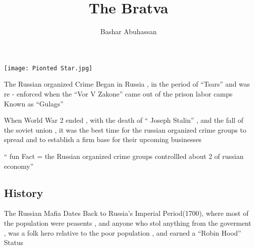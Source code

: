 \documentclass{article}
\author{Bashar Abuhassan}
\title{The Bratva}
\begin{document}
\maketitle
\texttt{[image: Pionted Star.jpg]}

The Russian organized Crime Began in Russia , in the period of ``Tsars'' and was re - enforced when the ``Vor V Zakone'' came out of the prison labor camps Known as ``Gulags'' 

When World War 2 ended , with the death of `` Joseph Stalin'' , and the fall of the soviet union , it was the best time for the russian organized crime groups to spread and to establish a firm base for their upcoming businesses 

`` fun Fact = the Russian organized crime groups controllled about 2\3 of russian economy''

\begin{center}
\section{History}
\end{center}

The Russian Mafia Dates Back to Russia's Imperial Period(1700), where most of the population were peasents , and anyone who stol anything from the goverment , was a folk hero relative to the poor population , and earned a ``Robin Hood'' Status
 
\end{document}

